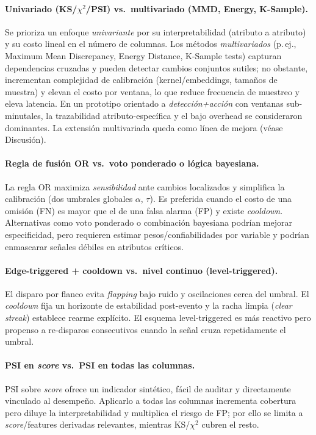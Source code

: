 \paragraph{Univariado (KS/$\chi^2$/PSI) vs.\ multivariado (MMD, Energy, K-Sample).}
Se prioriza un enfoque \emph{univariante} por su interpretabilidad (atributo a atributo) y su costo lineal en el número de columnas. Los métodos \emph{multivariados} (p.\,ej., Maximum Mean Discrepancy, Energy Distance, K-Sample tests) capturan dependencias cruzadas y pueden detectar cambios conjuntos sutiles; no obstante, incrementan complejidad de calibración (kernel/embeddings, tamaños de muestra) y elevan el costo por ventana, lo que reduce frecuencia de muestreo y eleva latencia. En un prototipo orientado a \emph{detección+acción} con ventanas sub-minutales, la trazabilidad atributo-específica y el bajo overhead se consideraron dominantes. La extensión multivariada queda como línea de mejora (véase Discusión).

\paragraph{Regla de fusión OR vs.\ voto ponderado o lógica bayesiana.}
La regla OR maximiza \emph{sensibilidad} ante cambios localizados y simplifica la calibración (dos umbrales globales $\alpha$, $\tau$). Es preferida cuando el costo de una omisión (FN) es mayor que el de una falsa alarma (FP) y existe \emph{cooldown}. Alternativas como voto ponderado o combinación bayesiana podrían mejorar especificidad, pero requieren estimar pesos/confiabilidades por variable y podrían enmascarar señales débiles en atributos críticos.

\paragraph{Edge-triggered + cooldown vs.\ nivel continuo (level-triggered).}
El disparo por flanco evita \emph{flapping} bajo ruido y oscilaciones cerca del umbral. El \emph{cooldown} fija un horizonte de estabilidad post-evento y la racha limpia (\emph{clear streak}) establece rearme explícito. El esquema level-triggered es más reactivo pero propenso a re-disparos consecutivos cuando la señal cruza repetidamente el umbral.

\paragraph{PSI en \emph{score} vs.\ PSI en todas las columnas.}
PSI sobre \emph{score} ofrece un indicador sintético, fácil de auditar y directamente vinculado al desempeño. Aplicarlo a todas las columnas incrementa cobertura pero diluye la interpretabilidad y multiplica el riesgo de FP; por ello se limita a \emph{score}/features derivadas relevantes, mientras KS/$\chi^2$ cubren el resto.


